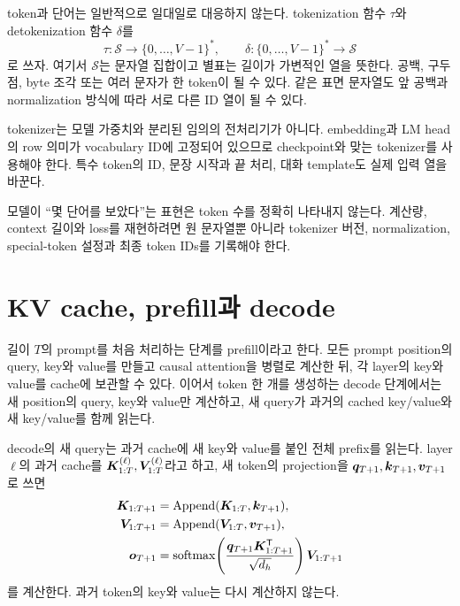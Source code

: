 token과 단어는 일반적으로 일대일로 대응하지 않는다.
tokenization 함수 $\tau$와 detokenization 함수 $\delta$를
\begin{equation}
  \tau:\mathcal{S}\to\{0,\ldots,V-1\}^{*},\qquad
  \delta:\{0,\ldots,V-1\}^{*}\to\mathcal{S}
\end{equation}
로 쓰자.
여기서 $\mathcal{S}$는 문자열 집합이고 별표는 길이가 가변적인 열을 뜻한다.
공백, 구두점, byte 조각 또는 여러 문자가 한 token이 될 수 있다.
같은 표면 문자열도 앞 공백과 normalization 방식에 따라 서로 다른 ID 열이 될 수 있다.

tokenizer는 모델 가중치와 분리된 임의의 전처리기가 아니다.
embedding과 LM head의 row 의미가 vocabulary ID에 고정되어 있으므로 checkpoint와 맞는 tokenizer를 사용해야 한다.
특수 token의 ID, 문장 시작과 끝 처리, 대화 template도 실제 입력 열을 바꾼다.

\begin{limitbox}
모델이 ``몇 단어를 보았다''는 표현은 token 수를 정확히 나타내지 않는다.
계산량, context 길이와 loss를 재현하려면 원 문자열뿐 아니라 tokenizer 버전, normalization, special-token 설정과 최종 token IDs를 기록해야 한다.
\end{limitbox}

\section{KV cache, prefill과 decode}

길이 $T$의 prompt를 처음 처리하는 단계를 prefill이라고 한다.
모든 prompt position의 query, key와 value를 만들고 causal attention을 병렬로 계산한 뒤, 각 layer의 key와 value를 cache에 보관할 수 있다.
이어서 token 한 개를 생성하는 decode 단계에서는 새 position의 query, key와 value만 계산하고, 새 query가 과거의 cached key/value와 새 key/value를 함께 읽는다.

decode의 새 query는 과거 cache에 새 key와 value를 붙인 전체 prefix를 읽는다.
layer $\ell$의 과거 cache를 $\bm{K}^{(\ell)}_{1:T},\bm{V}^{(\ell)}_{1:T}$라고 하고, 새 token의 projection을 $\bm{q}_{T+1},\bm{k}_{T+1},\bm{v}_{T+1}$로 쓰면
\begin{align}
  \bm{K}_{1:T+1}&=\operatorname{Append}(\bm{K}_{1:T},\bm{k}_{T+1}),\\
  \bm{V}_{1:T+1}&=\operatorname{Append}(\bm{V}_{1:T},\bm{v}_{T+1}),\\
  \bm{o}_{T+1}&=
  \operatorname{softmax}\!\left(\frac{\bm{q}_{T+1}\bm{K}_{1:T+1}^{\mathsf T}}
  {\sqrt{d_h}}\right)\bm{V}_{1:T+1}
\end{align}
를 계산한다.
과거 token의 key와 value는 다시 계산하지 않는다.

